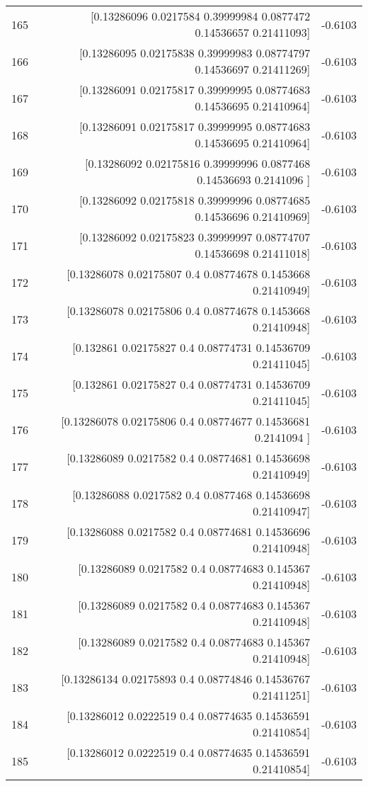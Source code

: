 \begin{longtable}{lrr}
165 & [0.13286096 0.0217584  0.39999984 0.0877472  0.14536657 0.21411093] & -0.6103 \\
166 & [0.13286095 0.02175838 0.39999983 0.08774797 0.14536697 0.21411269] & -0.6103 \\
167 & [0.13286091 0.02175817 0.39999995 0.08774683 0.14536695 0.21410964] & -0.6103 \\
168 & [0.13286091 0.02175817 0.39999995 0.08774683 0.14536695 0.21410964] & -0.6103 \\
169 & [0.13286092 0.02175816 0.39999996 0.0877468  0.14536693 0.2141096 ] & -0.6103 \\
170 & [0.13286092 0.02175818 0.39999996 0.08774685 0.14536696 0.21410969] & -0.6103 \\
171 & [0.13286092 0.02175823 0.39999997 0.08774707 0.14536698 0.21411018] & -0.6103 \\
172 & [0.13286078 0.02175807 0.4        0.08774678 0.1453668  0.21410949] & -0.6103 \\
173 & [0.13286078 0.02175806 0.4        0.08774678 0.1453668  0.21410948] & -0.6103 \\
174 & [0.132861   0.02175827 0.4        0.08774731 0.14536709 0.21411045] & -0.6103 \\
175 & [0.132861   0.02175827 0.4        0.08774731 0.14536709 0.21411045] & -0.6103 \\
176 & [0.13286078 0.02175806 0.4        0.08774677 0.14536681 0.2141094 ] & -0.6103 \\
177 & [0.13286089 0.0217582  0.4        0.08774681 0.14536698 0.21410949] & -0.6103 \\
178 & [0.13286088 0.0217582  0.4        0.0877468  0.14536698 0.21410947] & -0.6103 \\
179 & [0.13286088 0.0217582  0.4        0.08774681 0.14536696 0.21410948] & -0.6103 \\
180 & [0.13286089 0.0217582  0.4        0.08774683 0.145367   0.21410948] & -0.6103 \\
181 & [0.13286089 0.0217582  0.4        0.08774683 0.145367   0.21410948] & -0.6103 \\
182 & [0.13286089 0.0217582  0.4        0.08774683 0.145367   0.21410948] & -0.6103 \\
183 & [0.13286134 0.02175893 0.4        0.08774846 0.14536767 0.21411251] & -0.6103 \\
184 & [0.13286012 0.0222519  0.4        0.08774635 0.14536591 0.21410854] & -0.6103 \\
185 & [0.13286012 0.0222519  0.4        0.08774635 0.14536591 0.21410854] & -0.6103 \\

\end{longtable}
